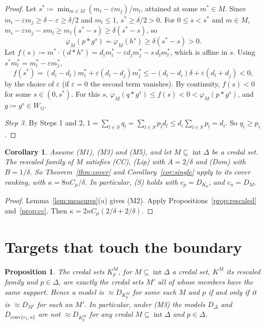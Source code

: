 \documentclass[11pt]{article}
\newtheorem{proposition}[theorem]{Proposition}
\newtheorem{corollary}[theorem]{Corollary}
\theoremstyle{definition}
\begin{document}
\begin{proof}
Let $s^*\coloneqq\min_{m\in M}(m_i-\varepsilon m_j)/m_l$, attained at some $m^*\in M$. Since $m_i-\varepsilon m_j\ge\delta-\varepsilon\ge\delta/2$ and $m_l\le1$, $s^*\ge\delta/2>0$. For $0\le s<s^*$ and $m\in M$, $m_i-\varepsilon m_j-sm_l\ge m_l(s^*-s)\ge\delta(s^*-s)$, so
\[
\varphi_M(p*g^s)=\varphi_M(h^s)\ge\delta(s^*-s)>0.
\]
Let $f(s)\coloneqq m^*\cdot(d*h^s)=d_im^*_i-\varepsilon d_jm^*_j-s\,d_lm^*_l$, which is affine in $s$. Using $s^*m^*_l=m^*_i-\varepsilon m^*_j$,
\[
f(s^*)=(d_i-d_l)m^*_i+\varepsilon(d_l-d_j)m^*_j\le-(d_l-d_i)\delta+\varepsilon(d_l+d_j)<0,
\]
by the choice of $\varepsilon$ (if $\varepsilon=0$ the second term vanishes). By continuity, $f(s)<0$ for some $s\in(0,s^*)$. For this $s$, $\varphi_M(q*g^s)\le f(s)<0<\varphi_M(p*g^s)$, and $g\coloneqq g^s\in W_{ij}$.

\emph{Step 3.} By Steps 1 and 2, $1=\sum_{l\in S}q_l=\sum_{l\in S}p_ld_l\le d_i\sum_{l\in S}p_l=d_i$. So $q_i\ge p_i$.
\end{proof}

\begin{corollary}\label{cor:rescaled}
Assume (M1), (M3) and (M5), and let $M\subseteq\operatorname{int}\Delta$ be a credal set. The rescaled family of $M$ satisfies (CC), (Lip) with $A=2/\delta$ and (Dom) with $B=1/\delta$. So Theorem~\ref{thm:cover} and Corollary~\ref{cor:single} apply to its cover ranking, with $\kappa=8nC_\mu/\delta$. In particular, (S) holds with $c_p=D_{K_p}$, and $c_u=D_M$.
\end{corollary}

\begin{proof}
Lemma~\ref{lem:measures}(a) gives (M2). Apply Propositions~\ref{prop:rescaled} and~\ref{prop:cc}. Then $\kappa=2nC_\mu(2/\delta+2/\delta)$.
\end{proof}

\section{Targets that touch the boundary}\label{sec:boundary}

\begin{proposition}\label{prop:reach}
The credal sets $K^M_p$, for $M\subseteq\operatorname{int}\Delta$ a credal set, $K^M$ its rescaled family and $p\in\Delta$, are exactly the credal sets $M'$ all of whose members have the same support. Hence a model is $\approx D_{K^M_p}$ for some such $M$ and $p$ if and only if it is $\approx D_{M'}$ for such an $M'$. In particular, under (M3) the models $D_\Delta$ and $D_{\mathrm{conv}\{e_1,u\}}$ are not $\approx D_{K^M_p}$ for any credal $M\subseteq\operatorname{int}\Delta$ and $p\in\Delta$.
\end{proposition}
\end{document}
